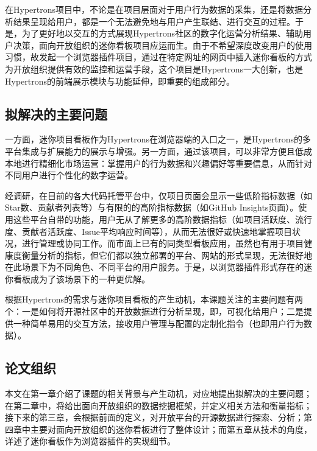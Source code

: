 \par 在Hypertrons项目中，不论是在项目层面对于用户行为数据的采集，还是将数据分析结果呈现给用户，都是一个无法避免地与用户产生联结、进行交互的过程。于是，为了更好地以交互的方式展现Hypertrons社区的数字化运营分析结果、辅助用户决策，面向开放组织的迷你看板项目应运而生。由于不希望深度改变用户的使用习惯，故发起一个浏览器插件项目，通过在特定网址的网页中插入迷你看板的方式为开放组织提供有效的监控和运营手段，这个项目是Hypertrons一大创新，也是Hypertrons的前端展示模块与功能延伸，即重要的组成部分。


\subsection{拟解决的主要问题}

\par 一方面，迷你项目看板作为Hypertrons在浏览器端的入口之一，是Hypertrons的多平台集成与扩展能力的展示与增强。另一方面，通过该项目，可以非常方便且低成本地进行精细化市场运营：掌握用户的行为数据和兴趣偏好等重要信息，从而针对不同用户进行个性化的数字运营。

\par 经调研，在目前的各大代码托管平台中，仅项目页面会显示一些低阶指标数据（如Star数、贡献者列表等）与有限的的高阶指标数据（如GitHub Insights页面）。使用这些平台自带的功能，用户无从了解更多的高阶数据指标（如项目活跃度、流行度、贡献者活跃度、Issue平均响应时间等），从而无法很好或快速地掌握项目状况，进行管理或协同工作。而市面上已有的同类型看板应用，虽然也有用于项目健康度衡量分析的指标，但它们都以独立部署的平台、网站的形式呈现，无法很好地在此场景下为不同角色、不同平台的用户服务。于是，以浏览器插件形式存在的迷你看板成为了该场景下的一种更优解。

\par 根据Hypertrons的需求与迷你项目看板的产生动机，本课题关注的主要问题有两个：一是如何将开源社区中的开放数据进行分析呈现，即，可视化给用户；二是提供一种简单易用的交互方法，接收用户管理与配置的定制化指令（也即用户行为数据）。

\subsection{论文组织}

\par 本文在第一章介绍了课题的相关背景与产生动机，对应地提出拟解决的主要问题；在第二章中，将给出面向开放组织的数据挖掘框架，并定义相关方法和衡量指标；接下来的第三章，会根据前面的定义，对开放平台的开源数据进行探索、分析；第四章中主要对面向开放组织的迷你看板进行了整体设计；而第五章从技术的角度，详述了迷你看板作为浏览器插件的实现细节。